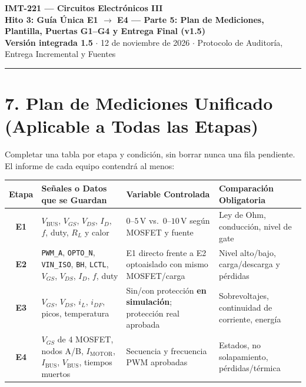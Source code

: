 \documentclass[10pt, a4paper, landscape]{article}
\begin{document}
\noindent
{\LARGE \textbf{\textcolor{ucbblue}{IMT-221 — Circuitos Electrónicos III}}}\\[0.12cm]
{\Large \textbf{Hito 3: Guía Única E1 $\rightarrow$ E4 — Parte 5: Plan de Mediciones, Plantilla, Puertas G1--G4 y Entrega Final (v1.5)}}\\[0.08cm]
{\small \textbf{Versión integrada 1.5} $\cdot$ 12 de noviembre de 2026 $\cdot$ Protocolo de Auditoría, Entrega Incremental y Fuentes}
\par\vspace{0.15cm}\noindent\rule{\linewidth}{0.4pt}\vspace{0.2cm}

\section*{7. Plan de Mediciones Unificado (Aplicable a Todas las Etapas)}

Completar una tabla por etapa y condición, sin borrar nunca una fila pendiente. El informe de cada equipo contendrá al menos:

\par\vspace{0.1cm}\noindent
\renewcommand{\arraystretch}{1.25}
\begin{tabularx}{\linewidth}{|c|>{\raggedright\arraybackslash}p{6.4cm}|>{\raggedright\arraybackslash}p{6.2cm}|>{\raggedright\arraybackslash}X|}
\hline
\rowcolor{ucbgray}
\textbf{Etapa} & \textbf{Señales o Datos que se Guardan} & \textbf{Variable Controlada} & \textbf{Comparación Obligatoria} \\ \hline
\textbf{E1} & $V_{\text{BUS}}$, $V_{GS}$, $V_{DS}$, $I_D$, $f$, duty, $R_L$ y calor & $0\text{--}5\,\text{V}$ vs.\ $0\text{--}10\,\text{V}$ según MOSFET y fuente & Ley de Ohm, conducción, nivel de gate \\ \hline
\textbf{E2} & \texttt{PWM\_A}, \texttt{OPTO\_N}, \texttt{VIN\_ISO}, \texttt{BH}, \texttt{LCTL}, $V_{GS}$, $V_{DS}$, $I_D$, $f$, duty & E1 directo frente a E2 optoaislado con mismo MOSFET/carga & Nivel alto/bajo, carga/descarga y pérdidas \\ \hline
\textbf{E3} & $V_{GS}$, $V_{DS}$, $i_L$, $i_{DF}$, picos, temperatura & Sin/con protección \textbf{en simulación}; protección real aprobada & Sobrevoltajes, continuidad de corriente, energía \\ \hline
\textbf{E4} & $V_{GS}$ de 4 MOSFET, nodos A/B, $I_{\text{MOTOR}}$, $I_{\text{BUS}}$, $V_{\text{BUS}}$, tiempos muertos & Secuencia y frecuencia PWM aprobadas & Estados, no solapamiento, pérdidas/térmica \\ \hline
\end{tabularx}
\end{document}
